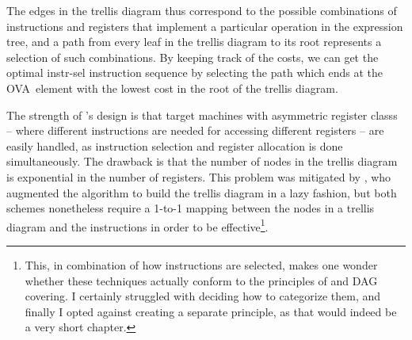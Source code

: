 {%
%        
%

The \glspl{edge} in the \gls{trellis diagram} thus correspond to the possible
combinations of \glspl{instruction} and \glspl{register} that implement a
particular operation in the \gls{expression tree}, and a path from every \gls{leaf}
in the \gls{trellis diagram} to its \gls{root} represents a selection of such
combinations.
%
By keeping track of the costs, we can get the \gls{optimal
  instr-sel} \gls{instruction} sequence by selecting the path which ends at the
\gls{OVA}~element with the lowest cost in the \gls{root} of the \gls{trellis
  diagram}.

The strength of \citeauthor{Wess1992}'s design is that \glspl{target machine}
with asymmetric \glspl{register class} -- where different \glspl{instruction}
are needed for accessing different \glspl{register} -- are easily handled, as
\gls{instruction selection} and \gls{register allocation} is done
simultaneously.
%
The drawback is that the number of \glspl{node} in the
\gls{trellis diagram} is exponential in the number of \glspl{register}.
%
This
problem was mitigated by \textcite{Frohlich1999}, who augmented the algorithm to
build the \gls{trellis diagram} in a lazy fashion, but both schemes nonetheless
require a \mbox{1-to-1} mapping between the \glspl{node} in a \gls{trellis
  diagram} and the \glspl{instruction} in order to be effective\footnote{This,
  in combination of how \glspl{instruction} are selected, makes one wonder
  whether these techniques actually conform to the \glspl{principle} of
   and \gls{DAG covering}.
%
I certainly struggled with
  deciding how to categorize them, and finally I opted against creating a
  separate \gls{principle}, as that would indeed be a very short chapter.}.


}
